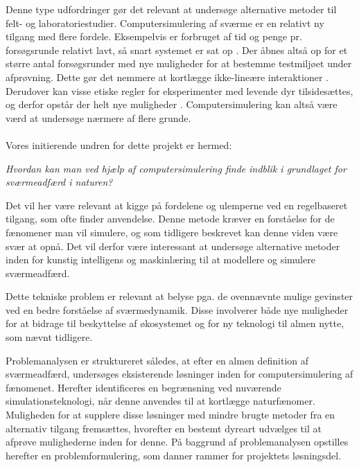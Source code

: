 \par
Denne type udfordringer gør det relevant at undersøge alternative metoder til felt- og laboratoriestudier. Computersimulering af sværme er en relativt ny tilgang med flere fordele. Eksempelvis er forbruget af tid og penge pr. forsøgsrunde relativt lavt, så snart systemet er sat op  \cite{simulationintro1}\cite{simulationintro2}. Der åbnes altså op for et større antal forsøgsrunder med nye muligheder for at bestemme testmiljøet under afprøvning. Dette gør det nemmere at kortlægge ikke-lineære interaktioner \cite{nonlinear}. Derudover kan visse etiske regler for eksperimenter med levende dyr tilsidesættes, og derfor opstår der helt nye muligheder \cite{animalethics}. Computersimulering kan altså være værd at undersøge nærmere af flere grunde.
\\\\
Vores initierende undren for dette projekt er hermed: 
\par
\textit{Hvordan kan man ved hjælp af computersimulering finde indblik i grundlaget for sværmeadfærd i naturen?}
\par
Det vil her være relevant at kigge på fordelene og ulemperne ved en regelbaseret tilgang, som ofte finder anvendelse. Denne metode kræver en forståelse for de fænomener man vil simulere, og som tidligere beskrevet kan denne viden være svær at opnå. Det vil derfor være interessant at undersøge alternative metoder inden for kunstig intelligens og maskinlæring til at modellere og simulere sværmeadfærd. 
\par
Dette tekniske problem er relevant at belyse pga. de ovennævnte mulige gevinster ved en bedre forståelse af sværmedynamik. Disse involverer både nye muligheder for at bidrage til beskyttelse af økosystemet og for ny teknologi til almen nytte, som nævnt tidligere.
\par
Problemanalysen er struktureret således, at efter en almen definition af sværmeadfærd, undersøges eksisterende løsninger inden for computersimulering af fænomenet. Herefter identificeres en begrænsning ved nuværende simulationsteknologi, når denne anvendes til at kortlægge naturfænomer. Muligheden for at supplere disse løsninger med mindre brugte metoder fra en alternativ tilgang fremsættes, hvorefter en bestemt dyreart udvælges til at afprøve mulighederne inden for denne. På baggrund af problemanalysen opstilles herefter en problemformulering, som danner rammer for projektets løsningsdel.





